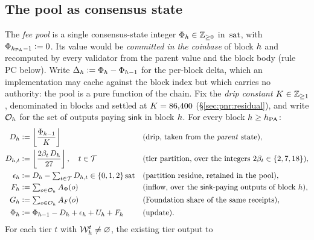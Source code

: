 \subsection{The pool as consensus state}
\label{sec:pnr:pool}

\begin{definition}
\label{def:pnr:pool}
The \emph{fee pool} is a single consensus-state integer $\Phi_{h} \in \mathbb{Z}_{\ge 0}$ in
$\,\mathrm{sat}$, with $\Phi_{h_{\mathrm{PA}} - 1} \vcentcolon= 0$. Its value would be \emph{committed in the coinbase} of
block $h$ and recomputed by every validator from the parent value and the block body (rule PC
below). Write $\Delta_{h} \vcentcolon= \Phi_{h} - \Phi_{h-1}$ for the per-block delta, which an
implementation may cache against the block index but which carries no authority: the pool is a pure
function of the chain. Fix the \emph{drip constant} $K \in \mathbb{Z}_{\ge 1}$, denominated in
blocks and settled at $K = 86{,}400$ (\S\ref{sec:pnr:residual}), and write $\mathcal{O}_{h}$
for the set of outputs paying $\mathsf{sink}$ in block $h$. For every block $h \ge h_{\mathrm{PA}}$:
\begin{align}
  D_{h}      &\vcentcolon= \left\lfloor \frac{\Phi_{h-1}}{K} \right\rfloor
                 &&\text{(drip, taken from the \emph{parent} state)}, \label{eq:pnr:drip}\\
  D_{h,t}  &\vcentcolon= \left\lfloor \frac{2\beta_{t}\,D_{h}}{27} \right\rfloor, \quad t \in \mathcal{T}
                 &&\text{(tier partition, over the integers $2\beta_{t} \in \{2,7,18\}$)},
                 \label{eq:pnr:tier}\\
  \epsilon_{h} &\vcentcolon= D_{h} - \textstyle\sum_{t \in \mathcal{T}} D_{h,t} \in \{0,1,2\}\,\mathrm{sat}
                 &&\text{(partition residue, retained in the pool)}, \label{eq:pnr:eps}\\
  F_{h}      &\vcentcolon= \textstyle\sum_{o \in \mathcal{O}_{h}} A_\Phi(o)
                 &&\text{(inflow, over the $\mathsf{sink}$-paying outputs of block $h$)},
                 \label{eq:pnr:inflow}\\
  G_{h}      &\vcentcolon= \textstyle\sum_{o \in \mathcal{O}_{h}} A_F(o)
                 &&\text{(Foundation share of the same receipts)}, \label{eq:pnr:found}\\
  \Phi_{h}  &\vcentcolon= \Phi_{h-1} - D_{h} + \epsilon_{h} + U_{h} + F_{h}
                 &&\text{(update)}. \label{eq:pnr:update}
\end{align}
For each tier $t$ with $\mathcal{W}_{h}^{t} \ne \varnothing$, the existing tier output to

\end{definition}
